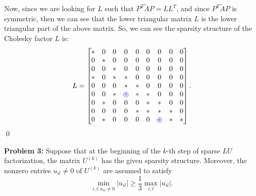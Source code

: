 \documentclass[12pt]{article}
\newcommand{\circlesign}[1]{ 
    \mathbin{
        \mathchoice
        {\buildcirclesign{\displaystyle}{#1}}
        {\buildcirclesign{\textstyle}{#1}}
        {\buildcirclesign{\scriptstyle}{#1}}
        {\buildcirclesign{\scriptscriptstyle}{#1}}
    } 
}
\newcommand\buildcirclesign[2]{%
    \begin{tikzpicture}[baseline=(X.base), inner sep=0, outer sep=0]
    \node[draw,circle] (X)  {\ensuremath{#1 #2}};
    \end{tikzpicture}%
}
\begin{document}
\begin{itemize}
Now, since we are looking for $L$ such that $P^T\tilde{A}P = LL^T$, and since $P^T\tilde{A}P$ is symmetric, then we can see that the lower triangular matrix $L$ is the lower triangular part of the above matrix.  So, we can see the sparsity structure of the Cholesky factor $L$ is:
$$L = \begin{bmatrix}
* & 0 & 0 & 0 & 0 & 0 & 0 & 0 & 0 \\
0 & * & 0 & 0 & 0 & 0 & 0 & 0 & 0 \\
0 & 0 & * & 0 & 0 & 0 & 0 & 0 & 0 \\
* & 0 & * & * & 0 & 0 & 0 & 0 & 0 \\
0 & 0 & 0 & * & * & 0 & 0 & 0 & 0 \\
0 & 0 & * & \color{blue}\circlesign{*} & * & * & 0 & 0 & 0 \\
0 & * & 0 & 0 & 0 & * & * & 0 & 0 \\
0 & 0 & 0 & 0 & * & * & * & * & 0 \\
0 & * & 0 & 0 & 0 & 0 & \color{blue}\circlesign{*} & * & * \\
\end{bmatrix}.$$
\qed


\end{itemize}


\bigskip\bigskip
\noindent
\textbf{Problem 3:} Suppose that at the beginning of the $k$-th step of sparse $LU$ factorization, the matrix $U^{(k)}$ has the given sparsity structure.  Moreover, the nonzero entries $u_{il} \neq 0$ of $U^{(k)}$ are assumed to satisfy
$$\min_{i,l: u_{il}\neq 0} |u_{il}| \geq \frac{1}{3} \max_{i,l} |u_{il}|.$$\\
\end{document}
